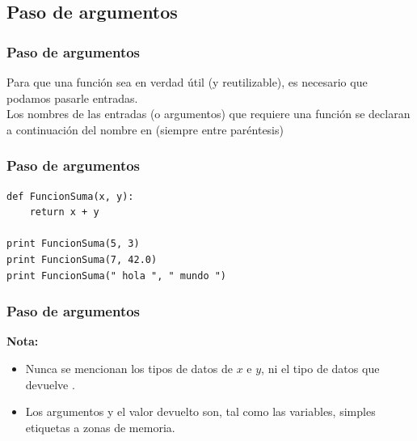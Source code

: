 \subsection{Paso de argumentos}
\begin{frame}[fragile]
\frametitle{Paso de argumentos}
Para que una función sea en verdad útil (y reutilizable), es necesario que podamos pasarle entradas. 
\\
\bigskip
Los nombres de las entradas (o argumentos) que requiere una función se declaran a continuación del nombre en  (siempre entre paréntesis)
\end{frame}
\begin{frame}[fragile]
\frametitle{Paso de argumentos}
\begin{lstlisting}[caption=Paso de argumentos en una función, basicstyle=\linespread{1.2}\ttfamily\small, columns=fullflexible,escapeinside=||]
def FuncionSuma(x, y):
    return x + y

print FuncionSuma(5, 3)
print FuncionSuma(7, 42.0)
print FuncionSuma(" hola ", " mundo ")
\end{lstlisting}
\end{frame}
\begin{frame}[fragile]
\frametitle{Paso de argumentos}
\textbf{Nota:} 
\begin{itemize}[<+->]
\item Nunca se mencionan los tipos de datos de $x$ e $y$, ni el tipo de datos que devuelve .
\item Los argumentos y el valor devuelto son, tal como las variables, simples etiquetas a zonas de memoria.
\end{itemize}  
\end{frame}
